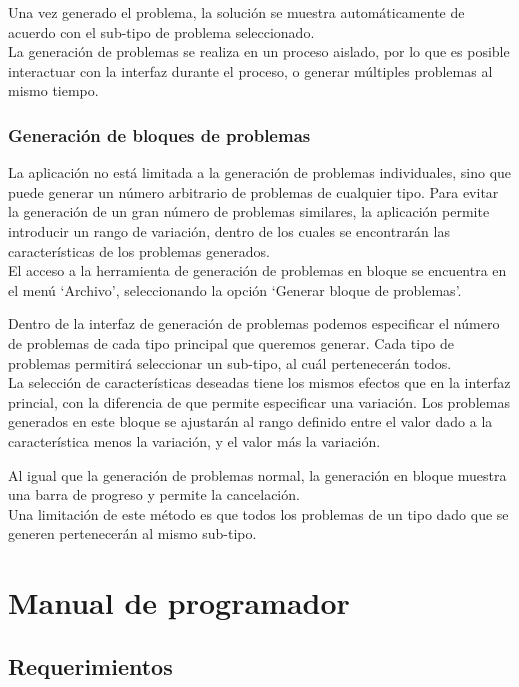 Una vez generado el problema, la solución se muestra automáticamente de acuerdo con el sub-tipo de problema seleccionado.
\\
La generación de problemas se realiza en un proceso aislado, por lo que es posible interactuar con la interfaz durante el proceso, o generar múltiples problemas al mismo tiempo.

\subsubsection{Generación de bloques de problemas}
La aplicación no está limitada a la generación de problemas individuales, sino que puede generar un número arbitrario de problemas de cualquier tipo.
Para evitar la generación de un gran número de problemas similares, la aplicación permite introducir un rango de variación, dentro de los cuales se encontrarán las características de los problemas generados.
\\
El acceso a la herramienta de generación de problemas en bloque se encuentra en el menú `Archivo', seleccionando la opción `Generar bloque de problemas'.


Dentro de la interfaz de generación de problemas podemos especificar el número de problemas de cada tipo principal que queremos generar.
Cada tipo de problemas permitirá seleccionar un sub-tipo, al cuál pertenecerán todos.
\\
La selección de características deseadas tiene los mismos efectos que en la interfaz princial, con la diferencia de que permite especificar una variación.
Los problemas generados en este bloque se ajustarán al rango definido entre el valor dado a la característica menos la variación, y el valor más la variación.


Al igual que la generación de problemas normal, la generación en bloque muestra una barra de progreso y permite la cancelación.
\\
Una limitación de este método es que todos los problemas de un tipo dado que se generen pertenecerán al mismo sub-tipo.


\section{Manual de programador}

\subsection{Requerimientos} %